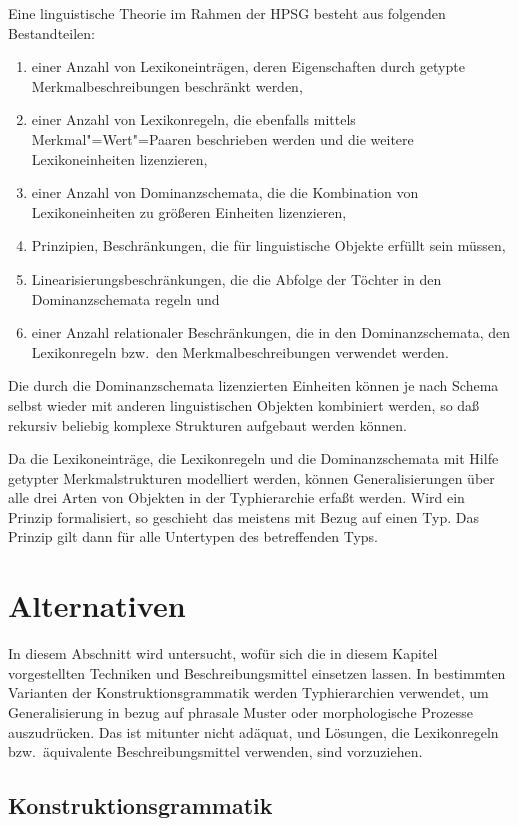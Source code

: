 Eine linguistische Theorie im Rahmen der HPSG besteht aus folgenden Bestandteilen:
\begin{enumerate}
\item einer Anzahl von Lexikoneinträgen, deren Eigenschaften durch getypte Merkmalbeschreibungen beschränkt werden,
\item einer Anzahl von Lexikonregeln, die ebenfalls mittels Merkmal"=Wert"=Paaren beschrieben werden und
      die weitere Lexikoneinheiten lizenzieren,
\item einer Anzahl von Dominanzschemata, die die Kombination von Lexikoneinheiten zu größeren Einheiten
      lizenzieren,
\item Prinzipien, \dash Beschränkungen, die für linguistische Objekte erfüllt sein müssen,
\item Linearisierungsbeschränkungen, die die Abfolge der Töchter in den Dominanzschemata regeln und
\item einer Anzahl relationaler Beschränkungen, die in den Dominanzschemata, den Lexikonregeln bzw.\
      den Merkmalbeschreibungen verwendet werden.
\end{enumerate}
Die durch die Dominanzschemata lizenzierten Einheiten können je nach Schema
selbst wieder mit anderen linguistischen Objekten kombiniert
werden, so daß rekursiv beliebig komplexe Strukturen aufgebaut werden können.

Da die Lexikoneinträge, die Lexikonregeln und die Dominanzschemata mit Hilfe getypter Merkmalstrukturen
modelliert werden, können Generalisierungen über alle drei Arten von Objekten in der Typhierarchie
erfaßt werden. Wird ein Prinzip formalisiert, so geschieht das meistens mit Bezug auf einen Typ. Das Prinzip
gilt dann für alle Untertypen des betreffenden Typs.


\section{Alternativen}

\mbox{}%
In diesem Abschnitt wird untersucht, wofür sich die in diesem Kapitel vorgestellten Techniken und Beschreibungsmittel
einsetzen lassen. In bestimmten Varianten der Konstruktionsgrammatik werden Typhierarchien verwendet, um Generalisierung in bezug
auf phrasale Muster oder morphologische Prozesse auszudrücken. Das ist mitunter nicht adäquat, und Lösungen,
die Lexikonregeln bzw.\ äquivalente Beschreibungsmittel verwenden, sind vorzuziehen.

\subsection{Konstruktionsgrammatik}

